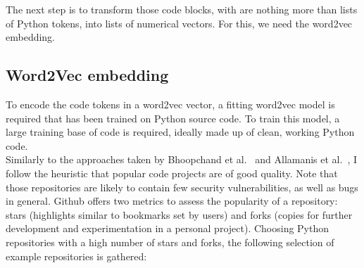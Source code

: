 \documentclass[
a4paper,
pagesize,
pdftex,
12pt,
twoside, %
BCOR=5mm, %
ngerman,
fleqn,
final,
]{scrartcl}
\begin{document}
	The next step is to transform those code blocks, with are nothing more than lists of Python tokens, into lists of numerical vectors. For this, we need the word2vec embedding. 
	
	\subsection{Word2Vec embedding}
	To encode the code tokens in a word2vec vector, a fitting word2vec model is required that has been trained on Python source code. To train this model, a large training base of code is required, ideally made up of clean, working Python code.\\
	Similarly to the approaches taken by Bhoopchand et al.~\cite{Bhoopchand.2016} and Allamanis et al.~\cite{Allamanis.2013}, I follow the heuristic that popular code projects are of good quality. Note that those repositories are likely to contain few security vulnerabilities, as well as bugs in general. Github offers two metrics to assess the popularity of a repository: stars (highlights similar to bookmarks set by users) and forks (copies for further development and experimentation in a personal project). Choosing Python repositories with a high number of stars and forks, the following selection of example repositories is gathered:
	
\end{document}
